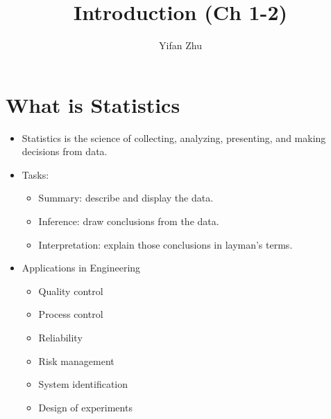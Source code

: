 \documentclass[handout]{beamer}
\title{Introduction (Ch 1-2)}
\author{Yifan Zhu}
\date{}
\institute{Iowa State University}
\numberwithin{equation}{section}
\begin{document}


\begin{frame}
\titlepage
 \end{frame}
 

\section{What is Statistics}

\begin{frame}
\begin{itemize}
\item Statistics is the science of collecting, analyzing, presenting, and making decisions from data. \pause
\item Tasks:
\begin{itemize}
\item Summary: describe and display the data. \pause
\item Inference: draw conclusions from the data.  \pause
\item Interpretation: explain those conclusions in layman's terms. 
\end{itemize}
 \pause \item Applications in Engineering 
\begin{itemize}
\item Quality control \pause
\item Process control \pause
\item Reliability \pause
\item Risk management \pause
\item System identification \pause
\item Design of experiments 
\end{itemize}
\end{itemize}
\end{frame}
\end{document}

